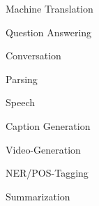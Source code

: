 \documentclass{beamer}
\let\tempone\itemize
\let\temptwo\enditemize
\renewenvironment{itemize}{\tempone\addtolength{\itemsep}{0.5\baselineskip}}{\temptwo}
\newcommand{\air}{\vspace{0.25cm}}
\newcommand{\Cite}[1]{{\footnotesize \citep{#1}}}
\def\argmax{\operatornamewithlimits{arg\,max}}
\def\argmax{\operatornamewithlimits{arg\,max}}
\begin{document}
\begin{frame}{}
  \begin{center}
  \end{center}

  \begin{itemize}
  \item \alert<2>{Machine Translation} \Cite{kalchbrenner2013recurrent,sutskever2014sequence, Cho2014, bahdanau2014neural,luong15effective} 
    \air

   
  \item Question Answering \Cite{Hermann2015} 
  \item Conversation \Cite{Vinyals2015} \Cite{Serban2016}
  \item Parsing \Cite{vinyals15grammar}
  \item Speech \Cite{Chorowski2015,Chan2015}
  \item Caption Generation \Cite{karpathy2015deep,Xu2015,Vinyals2015b}
  \item Video-Generation \Cite{Srivastava2015a}
  \item NER/POS-Tagging \Cite{Gillick2016}
  \item Summarization \Cite{Rush2015} 
    \air 

  \end{itemize}  
\end{frame}





\end{document}
